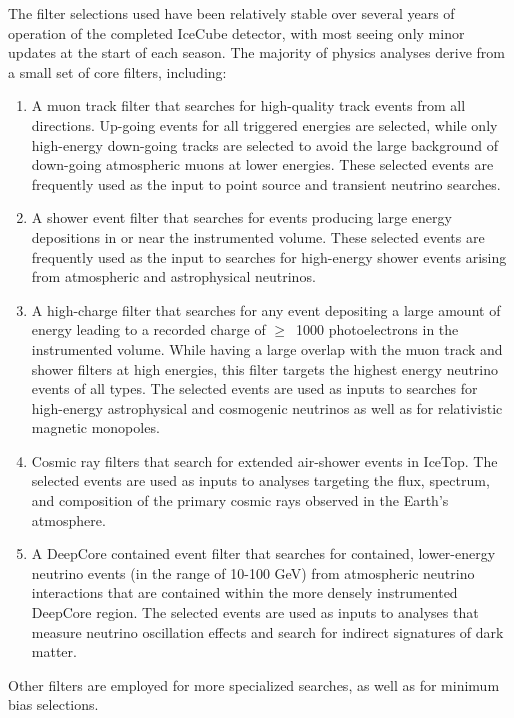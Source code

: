 The filter selections used have been relatively stable over several years
of operation of the completed IceCube detector, with most seeing only minor
updates at the 
start of each season.  The majority of physics analyses derive from a small
set of core filters, including:

\begin{enumerate}
\item A muon track filter that searches for high-quality track events from all
  directions.  Up-going events for all triggered energies are selected,
  while only high-energy 
  down-going tracks are selected to avoid the large background of
  down-going atmospheric muons at lower energies.  These selected events
  are frequently used as the input to point source and transient neutrino searches.
\item A shower event filter that searches for events producing large energy
  depositions in or near the instrumented volume.  These selected events are
  frequently used as the input to searches for high-energy shower events arising from
  atmospheric and astrophysical neutrinos.
\item A high-charge filter that searches for any event depositing a
  large amount of energy leading to a recorded charge of $\geq$~1000
  photoelectrons in the 
  instrumented volume.  While having a large overlap with the muon track
  and shower filters at high energies, this filter targets the highest
  energy neutrino events of all types. The selected events are used as
  inputs to searches for high-energy astrophysical and cosmogenic
  neutrinos as well as for relativistic magnetic monopoles.
\item Cosmic ray filters that search for extended air-shower events in
  IceTop.  The selected events are used as inputs to analyses 
  targeting the flux, spectrum, and composition of the primary cosmic rays
  observed in the Earth's atmosphere.
\item A DeepCore contained event filter that searches for contained, lower-energy
  neutrino events (in the range of 10-100 GeV) from atmospheric neutrino interactions
  that are contained within the more densely instrumented DeepCore region.
  The selected events are used as inputs to analyses that measure
  neutrino oscillation effects and search for indirect signatures of dark matter.
\end{enumerate}

Other filters are employed for more specialized searches, as well as for minimum bias selections.

